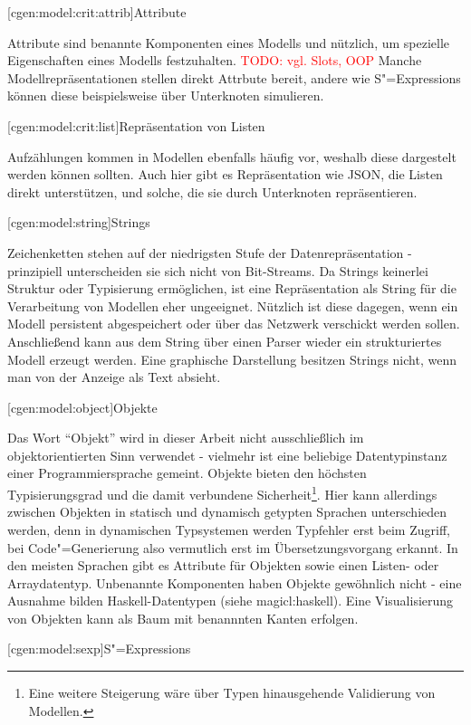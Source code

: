 \documentclass[a4paper, bibgerm]{book}
\newcommand{\todo}[1]{
  \textcolor{red}{TODO: #1}
}
\newcommand\lsubsection{}
\newcommand\lsubsubsection{}
\newcommand\sref{}
\newcommand{\sees}[1]{(siehe \sref{#1})}
\newcommand{\sexps}{S"=Expressions}
\newcommand{\cgen}{Code"=Generierung}
\begin{document}
\lsubsubsection[cgen:model:crit:attrib]{Attribute}

Attribute sind benannte Komponenten eines Modells und nützlich, um
spezielle Eigenschaften eines Modells festzuhalten. \todo{vgl. Slots,
  OOP} Manche Modellrepräsentationen stellen direkt Attrbute bereit,
andere wie \sexps{} können diese beispielsweise über Unterknoten
simulieren.

\lsubsubsection[cgen:model:crit:list]{Repräsentation von Listen}

Aufzählungen kommen in Modellen ebenfalls häufig vor, weshalb diese
dargestelt werden können sollten. Auch hier gibt es Repräsentation wie
JSON, die Listen direkt unterstützen, und solche, die sie durch
Unterknoten repräsentieren.

\lsubsection[cgen:model:string]{Strings}

Zeichenketten stehen auf der niedrigsten Stufe der Datenrepräsentation -
prinzipiell unterscheiden sie sich nicht von Bit-Streams. Da Strings
keinerlei Struktur oder Typisierung ermöglichen, ist eine Repräsentation
als String für die Verarbeitung von Modellen eher ungeeignet. Nützlich
ist diese dagegen, wenn ein Modell persistent abgespeichert oder über
das Netzwerk verschickt werden sollen. Anschließend kann aus dem String
über einen Parser wieder ein strukturiertes Modell erzeugt werden. Eine
graphische Darstellung besitzen Strings nicht, wenn man von der Anzeige
als Text absieht.

\lsubsection[cgen:model:object]{Objekte}

Das Wort ``Objekt'' wird in dieser Arbeit nicht ausschließlich im objektorientierten
Sinn verwendet - vielmehr ist eine beliebige Datentypinstanz einer
Programmiersprache gemeint. Objekte bieten den höchsten Typisierungsgrad
und die damit verbundene Sicherheit\footnote{Eine weitere Steigerung
  wäre über Typen hinausgehende Validierung von Modellen.}. Hier kann
allerdings zwischen Objekten in statisch und dynamisch getypten Sprachen
unterschieden werden, denn in dynamischen Typsystemen werden Typfehler
erst beim Zugriff, bei \cgen{} also vermutlich erst im
Übersetzungsvorgang erkannt. In den meisten Sprachen gibt es Attribute
für Objekten sowie einen Listen- oder Arraydatentyp. Unbenannte
Komponenten haben Objekte gewöhnlich nicht - eine Ausnahme bilden
Haskell-Datentypen \sees{magicl:haskell}. Eine Visualisierung von
Objekten kann als Baum mit benannnten Kanten erfolgen.

\lsubsection[cgen:model:sexp]{\sexps}
\end{document}

